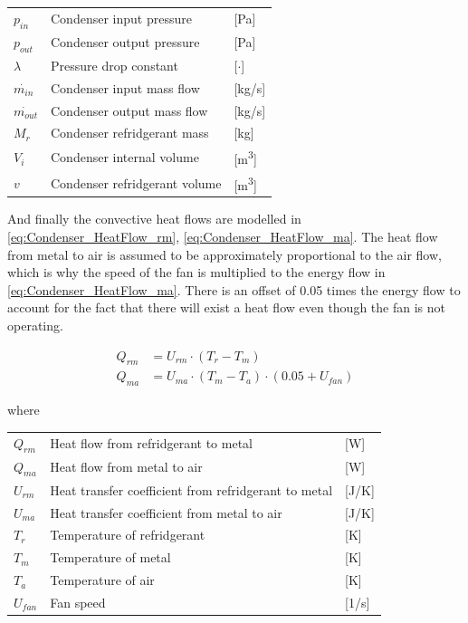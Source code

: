 \begin{center}
	\begin{tabular}{l p{8cm} l}
		$p_{in}$				&	Condenser input pressure					& [\si{Pa}] \\
		$p_{out}$				&	Condenser output pressure					& [\si{Pa}] \\
		$\lambda$				& 	Pressure drop constant	 					& [$\cdot$] \\
		$\dot{m_{in}}$			& 	Condenser input mass flow 					& [\si{kg}/\si{s}] \\
		$\dot{m_{out}}$			& 	Condenser output mass flow 					& [\si{kg}/\si{s}] \\	
		$M_{r}$					&	Condenser refridgerant mass					& [\si{kg}] \\
		$V_{i}$					&	Condenser internal volume					& [\si{m^3}] \\
		$v$						&	Condenser refridgerant volume				& [\si{m^3}] \\
	\end{tabular}
\end{center}


And finally the convective heat flows are modelled in \cref{eq:Condenser_HeatFlow_rm}, \cref{eq:Condenser_HeatFlow_ma}. The heat flow from metal to air is assumed to be approximately proportional to the air flow, which is why the speed of the fan is multiplied to the energy flow in \cref{eq:Condenser_HeatFlow_ma}. There is an offset of 0.05 times the energy flow to account for the fact that there will exist a heat flow even though the fan is not operating. 

\begin{align}
	Q_{rm}	 			& = U_{rm} \cdot (T_r - T_m)							\label{eq:Condenser_HeatFlow_rm}\\
	Q_{ma}	 			& = U_{ma} \cdot (T_m - T_a)\cdot (0.05 + U_{fan})				\label{eq:Condenser_HeatFlow_ma}
\end{align}	

where 

\begin{center}
	\begin{tabular}{l p{8cm} l}
		$Q_{rm}$				&	Heat flow from refridgerant to metal					& [\si{W}] \\
		$Q_{ma}$				&	Heat flow from metal to air								& [\si{W}] \\
		$U_{rm}$				& 	Heat transfer coefficient from refridgerant to metal 	& [\si{J}/\si{K}] \\
		$U_{ma}$				& 	Heat transfer coefficient from metal to air				& [\si{J}/\si{K}] \\
		$T_r$					& 	Temperature of refridgerant 							& [\si{K}] \\	
		$T_m$					&	Temperature of metal 									& [\si{K}] \\
		$T_a$					&	Temperature of air 										& [\si{K}] \\
		$U_{fan}$				&	Fan speed												& [1/\si{s}] \\
	\end{tabular}
\end{center}



